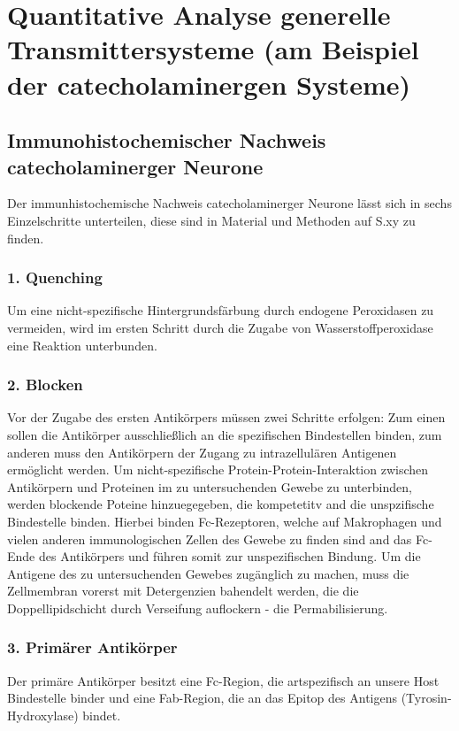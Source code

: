 \documentclass[12pt,a4paper,pdftex]{article}
\begin{document}
\newpage

\section{Quantitative Analyse generelle Transmittersysteme (am Beispiel der catecholaminergen Systeme)}
\label{sec:immu}
\subsection{Immunohistochemischer Nachweis catecholaminerger Neurone}
Der immunhistochemische Nachweis catecholaminerger Neurone lässt sich in sechs Einzelschritte unterteilen, diese sind in Material und Methoden auf S.xy zu finden.

\subsubsection*{1. Quenching}
Um eine nicht-spezifische Hintergrundsfärbung durch endogene Peroxidasen zu vermeiden, wird im ersten Schritt durch die Zugabe von Wasserstoffperoxidase eine Reaktion unterbunden. 

\subsubsection*{2. Blocken}
Vor der Zugabe des ersten Antikörpers müssen zwei Schritte erfolgen: Zum einen sollen die Antikörper ausschließlich an die spezifischen Bindestellen binden, zum anderen muss den Antikörpern der Zugang zu intrazellulären Antigenen ermöglicht werden.
Um nicht-spezifische Protein-Protein-Interaktion zwischen Antikörpern und Proteinen im zu untersuchenden Gewebe zu unterbinden, werden blockende Poteine hinzuegegeben, die kompetetitv and die unspzifische Bindestelle binden. Hierbei binden Fc-Rezeptoren, welche auf Makrophagen und vielen anderen immunologischen Zellen des Gewebe zu finden sind and das Fc-Ende des Antikörpers und führen somit zur unspezifischen Bindung. 
Um die Antigene des zu untersuchenden Gewebes zugänglich zu machen, muss die Zellmembran vorerst mit Detergenzien bahendelt werden, die die Doppellipidschicht durch Verseifung auflockern - die Permabilisierung.

\subsubsection*{3. Primärer Antikörper}
Der primäre Antikörper besitzt eine Fc-Region, die artspezifisch an unsere Host Bindestelle binder und eine Fab-Region, die an das Epitop des Antigens (Tyrosin-Hydroxylase) bindet.
\end{document}
